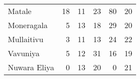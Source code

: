 \begin{tabular}{lrrrrr}
Matale       &          18 &          11 &           23 &               80 &          20 \\
Moneragala   &           5 &          13 &           18 &               29 &          20 \\
Mullaitivu   &           3 &          11 &           13 &               24 &          22 \\
Vavuniya     &           5 &          12 &           31 &               16 &          19 \\
Nuwara Eliya &           0 &          13 &           20 &                0 &          21 \\
\bottomrule
\end{tabular}
